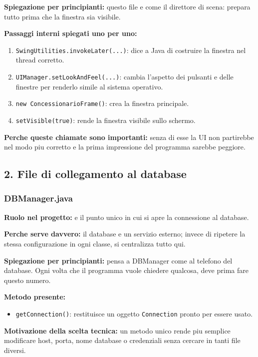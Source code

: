 \documentclass[12pt,a4paper]{article}
\begin{document}
\textbf{Spiegazione per principianti:} questo file e come il direttore di scena: prepara tutto prima che la finestra sia visibile.

\textbf{Passaggi interni spiegati uno per uno:}
\begin{enumerate}
  \item \texttt{SwingUtilities.invokeLater(...)}: dice a Java di costruire la finestra nel thread corretto.
  \item \texttt{UIManager.setLookAndFeel(...)}: cambia l'aspetto dei pulsanti e delle finestre per renderlo simile al sistema operativo.
  \item \texttt{new ConcessionarioFrame()}: crea la finestra principale.
  \item \texttt{setVisible(true)}: rende la finestra visibile sullo schermo.
\end{enumerate}

\textbf{Perche queste chiamate sono importanti:} senza di esse la UI non partirebbe nel modo piu corretto e la prima impressione del programma sarebbe peggiore.

\subsection{2. File di collegamento al database}

\subsubsection*{DBManager.java}
\textbf{Ruolo nel progetto:} e il punto unico in cui si apre la connessione al database.

\textbf{Perche serve davvero:} il database e un servizio esterno; invece di ripetere la stessa configurazione in ogni classe, si centralizza tutto qui.

\textbf{Spiegazione per principianti:} pensa a DBManager come al telefono del database. Ogni volta che il programma vuole chiedere qualcosa, deve prima fare questo numero.

\textbf{Metodo presente:}
\begin{itemize}
  \item \texttt{getConnection()}: restituisce un oggetto \texttt{Connection} pronto per essere usato.
\end{itemize}

\textbf{Motivazione della scelta tecnica:}
un metodo unico rende piu semplice modificare host, porta, nome database o credenziali senza cercare in tanti file diversi.
\end{document}
